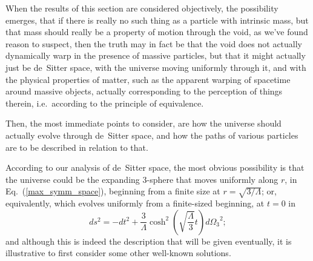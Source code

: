 When the results of this section are considered objectively, the possibility emerges, that if there is really no such thing as a particle with intrinsic mass, but that mass should really be a property of motion through the void, as we've found reason to suspect, then the truth may in fact be that the void does not actually dynamically warp in the presence of massive particles, but that it might actually just be de~Sitter space, with the universe moving uniformly through it, and with the physical properties of matter, such as the apparent warping of spacetime around massive objects, actually corresponding to the perception of things therein, i.e.~according to the principle of equivalence. 

Then, the most immediate points to consider, are how the universe should actually evolve through de~Sitter space, and how the paths of various particles are to be described in relation to that.

According to our analysis of de~Sitter space, the most obvious possibility is that the universe could be the expanding 3-sphere that moves uniformly along $r$, in Eq.~(\ref{max_symm_space}), beginning from a finite size at $r=\sqrt{3/\Lambda}$; or, equivalently, which evolves uniformly from a finite-sized beginning, at $t=0$ in
\begin{equation}
ds^2=-dt^2+\frac{3}{\Lambda}\cosh^2\left(\sqrt{\frac{\Lambda}{3}}t\right){d\Omega_3}^2;\label{dS_comoving_univ}
\end{equation} 
and although this is indeed the description that will be given eventually, it is illustrative to first consider some other well-known solutions. 

